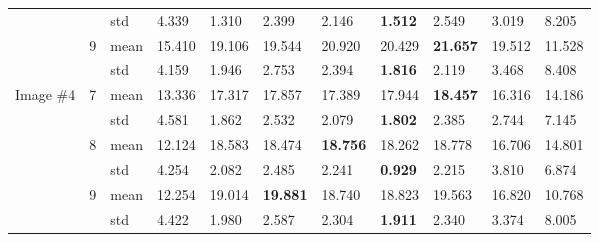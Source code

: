 \documentclass[conference]{IEEEtran}
\begin{document}
\begin{table}
\begin{tabularx}{\textwidth}{|X|X|X|X|X|X|X|X|X|X|X|}
& & std &4.339 & 1.310 & 2.399 & 2.146 & \textbf{1.512} & 2.549 & 3.019 & 8.205\\ \cline{2-11} 
& \multirow{2}{*}{9} & mean & 15.410 & 19.106 & 19.544 & 20.920 & 20.429 & \textbf{21.657} & 19.512 & 11.528 \\ \cline{3-11} 
& & std & 4.159 & 1.946 & 2.753 & 2.394 & \textbf{1.816} & 2.119 & 3.468 & 8.408\\ \hline
\multirow{6}{*}{Image \#4} & \multirow{2}{*}{7} & mean & 13.336 & 17.317 & 17.857 & 17.389 & 17.944 & \textbf{18.457} & 16.316 & 14.186 \\ \cline{3-11} 
& & std & 4.581 & 1.862 & 2.532 & 2.079 & \textbf{1.802} & 2.385 & 2.744 & 7.145\\ \cline{2-11} 
& \multirow{2}{*}{8} & mean & 12.124 & 18.583 & 18.474 & \textbf{18.756} & 18.262 & 18.778 & 16.706 & 14.801\\ \cline{3-11} 
& & std & 4.254 & 2.082 & 2.485 & 2.241 & \textbf{0.929} & 2.215 & 3.810 & 6.874\\ \cline{2-11} 
& \multirow{2}{*}{9} & mean & 12.254 & 19.014 & \textbf{19.881} & 18.740 & 18.823 & 19.563 & 16.820 & 10.768 \\ \cline{3-11} 
& & std & 4.422 & 1.980 & 2.587 & 2.304 & \textbf{1.911} & 2.340 & 3.374 & 8.005\\ \hline
\end{tabularx}
\label{tab:anexoB}
\end{table}
\end{document}
